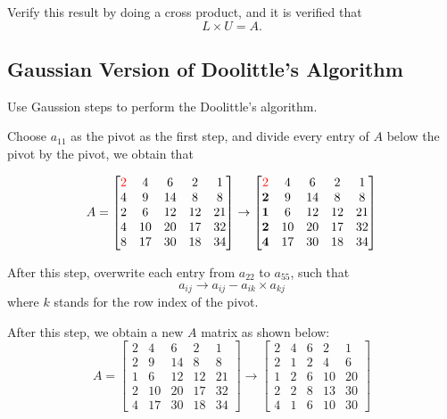 \documentclass[a4paper,titlepage]{article}
\begin{document}
			Verify this result by doing a cross product, and it is verified that 
			$$
				L \times U = A.
			$$
			
		\subsection{Gaussian Version of Doolittle's Algorithm}
			Use Gaussion steps to perform the Doolittle's algorithm. 
			
			Choose $a_{11}$ as the pivot as the first step, and divide every entry of $A$ below the pivot by the pivot, we obtain that
			
			$$
				A = \begin{bmatrix}
					\textcolor{red}{2} & 4 & 6 & 2 & 1\\
					4 & 9 & 14 & 8 & 8\\
					2 & 6 & 12 & 12 & 21\\
					4 & 10 & 20 & 17 & 32\\
					8 & 17 & 30 & 18 & 34
				\end{bmatrix} \rightarrow \begin{bmatrix}
					\textcolor{red}{2} & 4 & 6 & 2 & 1\\
					\textbf{2} & 9 & 14 & 8 & 8\\
					\textbf{1} & 6 & 12 & 12 & 21\\
					\textbf{2} & 10 & 20 & 17 & 32\\
					\textbf{4} & 17 & 30 & 18 & 34
				\end{bmatrix}
			$$
			
			After this step, overwrite each entry from $a_{22}$ to $a_{55}$, such that 
			$$
				a_{ij} \rightarrow a_{ij} - a_{ik} \times a_{kj}
			$$
			where $k$ stands for the row index of the pivot. 
			
			After this step, we obtain a new $A$ matrix as shown below:
			$$
				A = \begin{bmatrix}
					2 & 4 & 6 & 2 & 1\\
					2 & 9 & 14 & 8 & 8\\
					1 & 6 & 12 & 12 & 21\\
					2 & 10 & 20 & 17 & 32\\
					4 & 17 & 30 & 18 & 34
				\end{bmatrix} \rightarrow \begin{bmatrix}				
					2 & 4 & 6 & 2 & 1\\
					2 & 1 & 2 & 4 & 6\\
					1 & 2 & 6 & 10 & 20\\
					2 & 2 & 8 & 13 & 30\\
					4 & 1 & 6 & 10 & 30
				\end{bmatrix}
			$$
			
\end{document}
